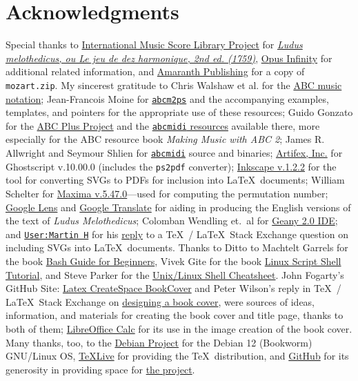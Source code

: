 \documentclass[a4paper,x11names,svgnames,10pt]{article}
\begin{document}
{\section{Acknowledgments}
Special thanks to \href{https://imslp.org}{International Music Score Library Project} for \href{https://imslp.org/wiki/Ludus_Melothedicus_(Anonymous)}{\it Ludus melothedicus, ou Le jeu de dez harmonique, 2nd ed. (1759)}, \href{https://opus-infinity.org}{Opus Infinity} for additional related information, and \href{http://www.amaranthpublishing.com/MozartDiceGame.htm}{Amaranth Publishing} for a copy of {\tt mozart.zip}. My sincerest gratitude to Chris Walshaw et al. for the \href{http://www.abcnotation.com/}{ABC music notation}; Jean-Francois Moine for \href{http://moinejf.free.fr/}{\tt abcm2ps} and the accompanying examples, templates, and pointers for the appropriate use of these resources; Guido Gonzato for the \href{http://abcplus.sourceforge.net/}{ABC Plus Project} and the \href{http://abcplus.sourceforge.net/#abcMIDI}{{\tt abcmidi} resources} available there, more especially for the ABC resource book {\em Making Music with ABC 2}; James R. Allwright and Seymour Shlien for \href{http://abc.sourceforge.net/abcMIDI}{\tt abcmidi} source and binaries; \href{https://artifex.com/}{Artifex, Inc.} for Ghostscript v.10.00.0 (includes the {\tt ps2pdf} converter); \href{https://www.inkscape.org/}{Inkscape v.1.2.2} for the tool for converting SVGs to PDFs for inclusion into \LaTeX\ documents; William Schelter for \href{https://maxima.sourceforge.io}{Maxima v.5.47.0}---used for computing the permutation number; \href{https://google.lens}{Google Lens} and \href{https://translate.google.com}{Google Translate} for aiding in producing the English versions of the text of {\it Ludus Melothedicus}; Colomban Wendling et.\ al for \href{https://www.geany.org}{Geany 2.0 IDE}; and \href{https://tex.stackexchange.com/users/632/martin-h}{\tt User:Martin H} for his \href{https://tex.stackexchange.com/questions/2099/how-to-include-svg-diagrams-in-latex}{reply} to a \TeX\ / \LaTeX\ Stack Exchange question on including SVGs into \LaTeX\ documents. Thanks to  Ditto to Machtelt Garrels for the book \href{http://tldp.org/LDP/Bash-Beginners-Guide/html/Bash-Beginners-Guide.html}{Bash Guide for Beginners}, Vivek Gite for the book \href{http://www.freeos.com/guides/lsst/}{Linux Script Shell Tutorial}, and Steve Parker for the \href{http://steve-parker.org/sh/cheatsheet.pdf}{Unix/Linux Shell Cheatsheet}. John Fogarty's GitHub Site: \href{https://github.com/jfogarty/latex-createspace-bookcover}{Latex CreateSpace BookCover} and Peter Wilson's reply in  \TeX\ / \LaTeX\ Stack Exchange on \href{https://tex.stackexchange.com/questions/17579/how-can-i-design-a-book-cover}{designing a book cover}, were sources of ideas, information, and materials for creating the book cover and title page, thanks to both of them; \href{http://www.libreoffice.org/}{LibreOffice Calc} for its use in the image creation of the book cover.  Many thanks, too, to the \href{https://www.debian.org}{Debian Project} for the Debian 12 (Bookworm) GNU/Linux OS, \href{http://www.tug.org/texlive/}{TeXLive} for providing the \TeX\ distribution,  and \href{https://github.com}{GitHub} for its generosity in providing space for \href{https://github.com/justineuro/mdgBookSVG8Kit}{the project}.  
}
\end{document}
